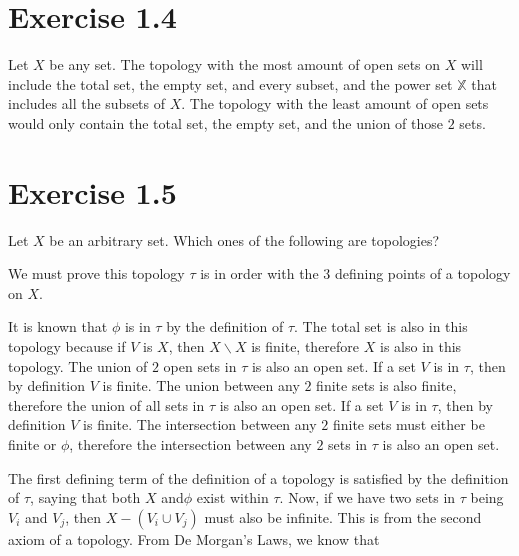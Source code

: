 \documentclass{report}
\begin{document}
\section{Exercise 1.4}

Let $X$ be any set. 
\sol The topology with the most amount of open sets on $X$ will include the total set, the empty set, and every subset, and the power set $\mathbb{X}$ that includes all the subsets of $X$. 
\sol The topology with the least amount of open sets would only contain the total set, the empty set, and the union of those $2$ sets.  

\section{Exercise 1.5}
Let $X$ be an arbitrary set. Which ones of the following are topologies?

\sol We must prove this topology $\tau$ is in order with the $3$ defining points of a topology on $X$. 

    It is known that $\phi$ is in $\tau$ by the definition of $\tau$. The total set is also in this topology because if $V$ is $X$, then $X \backslash X$ is finite, therefore $X$ is also in this topology. 
The union of $2$ open sets in $\tau$ is also an open set.
    If a set $V$ is in $\tau$, then by definition $V$ is finite. The union between any $2$ finite sets is also finite, therefore the union of all sets in $\tau$ is also an open set. 
    If a set $V$ is in $\tau$, then by definition $V$ is finite. The intersection between any $2$ finite sets must either be finite or $\phi$, therefore the intersection between any $2$ sets in $\tau$ is also an open set. 

\qs{1.5.b}{The \textit{coinfinite} topology: A set $V \subseteq X$ is open iff \[[X \backslash V \text{ is infinite or } V = \phi \text{ or } V = X\].} 
\sol The first defining term of the definition of a topology is satisfied by the definition of $\tau$, saying that both $X$ and$\phi$ exist within $\tau$.
Now, if we have two sets in $\tau$ being $V_i$ and $V_j$, then $X - (V_i \cup V_j)$ must also be infinite. This is from the second axiom of a topology. From De Morgan's Laws, we know that
\end{document}
